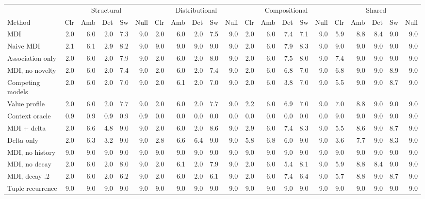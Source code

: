 \begin{tabular}{lrrrrrrrrrrrrrrrrrrrr}
\toprule
 & \multicolumn{5}{c}{Structural} & \multicolumn{5}{c}{Distributional} & \multicolumn{5}{c}{Compositional} & \multicolumn{5}{c}{Shared} \\
Method & Clr & Amb & Det & Sw & Null & Clr & Amb & Det & Sw & Null & Clr & Amb & Det & Sw & Null & Clr & Amb & Det & Sw & Null \\
\midrule
MDI & 2.0 & 6.0 & 2.0 & 7.3 & 9.0 & 2.0 & 6.0 & 2.0 & 7.5 & 9.0 & 2.0 & 6.0 & 7.4 & 7.1 & 9.0 & 5.9 & 8.8 & 8.4 & 9.0 & 9.0 \\
Naive MDI & 2.1 & 6.1 & 2.9 & 8.2 & 9.0 & 9.0 & 9.0 & 9.0 & 9.0 & 9.0 & 2.0 & 6.0 & 7.9 & 8.3 & 9.0 & 9.0 & 9.0 & 9.0 & 9.0 & 9.0 \\
Association only & 2.0 & 6.0 & 2.0 & 7.9 & 9.0 & 2.0 & 6.0 & 2.0 & 8.0 & 9.0 & 2.0 & 6.0 & 7.5 & 8.0 & 9.0 & 7.4 & 9.0 & 9.0 & 9.0 & 9.0 \\
MDI, no novelty & 2.0 & 6.0 & 2.0 & 7.4 & 9.0 & 2.0 & 6.0 & 2.0 & 7.4 & 9.0 & 2.0 & 6.0 & 6.8 & 7.0 & 9.0 & 6.8 & 9.0 & 9.0 & 8.9 & 9.0 \\
Competing models & 2.0 & 6.0 & 2.0 & 7.0 & 9.0 & 2.0 & 6.1 & 2.0 & 7.0 & 9.0 & 2.0 & 6.0 & 3.8 & 7.0 & 9.0 & 5.5 & 9.0 & 9.0 & 8.7 & 9.0 \\
Value profile & 2.0 & 6.0 & 2.0 & 7.7 & 9.0 & 2.0 & 6.0 & 2.0 & 7.7 & 9.0 & 2.2 & 6.0 & 6.9 & 7.0 & 9.0 & 7.0 & 8.8 & 9.0 & 9.0 & 9.0 \\
Context oracle & 0.9 & 0.9 & 0.9 & 0.9 & 0.9 & 0.0 & 0.0 & 0.0 & 0.0 & 0.0 & 0.0 & 0.0 & 0.0 & 0.0 & 0.0 & 9.0 & 9.0 & 9.0 & 9.0 & 9.0 \\
MDI + delta & 2.0 & 6.6 & 4.8 & 9.0 & 9.0 & 2.0 & 6.0 & 2.0 & 8.6 & 9.0 & 2.9 & 6.0 & 7.4 & 8.3 & 9.0 & 5.5 & 8.6 & 9.0 & 8.7 & 9.0 \\
Delta only & 2.0 & 6.3 & 3.2 & 9.0 & 9.0 & 2.8 & 6.6 & 6.4 & 9.0 & 9.0 & 5.8 & 6.8 & 6.0 & 9.0 & 9.0 & 3.6 & 7.7 & 9.0 & 8.3 & 9.0 \\
MDI, no history & 9.0 & 9.0 & 9.0 & 9.0 & 9.0 & 9.0 & 9.0 & 9.0 & 9.0 & 9.0 & 9.0 & 9.0 & 9.0 & 9.0 & 9.0 & 9.0 & 9.0 & 9.0 & 9.0 & 9.0 \\
MDI, no decay & 2.0 & 6.0 & 2.0 & 8.0 & 9.0 & 2.0 & 6.1 & 2.0 & 7.9 & 9.0 & 2.0 & 6.0 & 5.4 & 8.1 & 9.0 & 5.9 & 8.8 & 8.4 & 9.0 & 9.0 \\
MDI, decay .2 & 2.0 & 6.0 & 2.0 & 6.2 & 9.0 & 2.0 & 6.0 & 2.0 & 6.1 & 9.0 & 2.0 & 6.0 & 7.4 & 6.4 & 9.0 & 5.7 & 8.8 & 9.0 & 8.7 & 9.0 \\
Tuple recurrence & 9.0 & 9.0 & 9.0 & 9.0 & 9.0 & 9.0 & 9.0 & 9.0 & 9.0 & 9.0 & 9.0 & 9.0 & 9.0 & 9.0 & 9.0 & 9.0 & 9.0 & 9.0 & 9.0 & 9.0 \\

\end{tabular}
